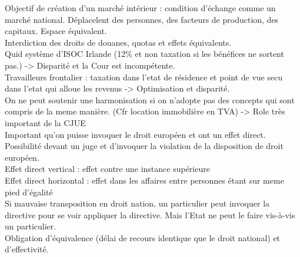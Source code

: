 \documentclass{book}
\begin{document}
Objectif de création d'un marché intérieur : condition d'échange comme un marché national. Déplacelent des personnes, des facteurs de production, des capitaux. Espace équivalent. \\

Interdiction des droits de douanes, quotas et effets équivalents.\\

Quid système d'ISOC Irlande (12\% et non taxation si les bénéfices ne sortent pas.) -> Disparité et la Cour est incompétente.\\

Travailleurs frontalier : taxation dans l'etat de résidence et point de vue secu dans l'etat qui alloue les revenus -> Optimisation et disparité.\\

On ne peut soutenir une harmonisation si on n'adopte pas des concepts qui sont compris de la meme manière. (Cfr location immobilière en TVA) -> Role très important de la CJUE\\

Important qu'on puisse invoquer le droit européen et ont un effet direct. Possibilité devant un juge et d'invoquer la violation de la disposition de droit européen.\\

Effet direct vertical : effet contre une instance supérieure\\

Effet direct horizontal : effet dans les affaires entre personnes étant sur meme pied d'égalité\\

Si mauvaise transposition en droit nation, un particulier peut invoquer la directive pour se voir appliquer la directive. Mais l'Etat ne peut le faire vis-à-vis un particulier.\\

Obligation d'équivalence (délai de recours identique que le droit national) et d'effectivité.
  


\nocite{*}

\end{document}
